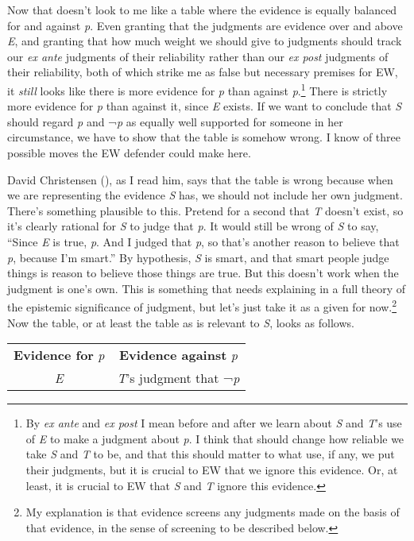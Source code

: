 \documentclass[
  11pt,
  letterpaper,
  DIV=11,
  numbers=noendperiod,
  twoside]{scrartcl}
\begin{document}
Now that doesn't look to me like a table where the evidence is equally
balanced for and against \emph{p}. Even granting that the judgments are
evidence over and above \emph{E}, and granting that how much weight we
should give to judgments should track our \emph{ex ante} judgments of
their reliability rather than our \emph{ex post} judgments of their
reliability, both of which strike me as false but necessary premises for
EW, it \emph{still} looks like there is more evidence for \emph{p} than
against \emph{p}.\footnote{By \emph{ex ante} and \emph{ex post} I mean
  before and after we learn about \emph{S} and \emph{T}'s use of
  \emph{E} to make a judgment about \emph{p}. I think that should change
  how reliable we take \emph{S} and \emph{T} to be, and that this should
  matter to what use, if any, we put their judgments, but it is crucial
  to EW that we ignore this evidence. Or, at least, it is crucial to EW
  that \emph{S} and \emph{T} ignore this evidence.} There is strictly
more evidence for \emph{p} than against it, since \emph{E} exists. If we
want to conclude that \emph{S} should regard \emph{p} and ¬\emph{p} as
equally well supported for someone in her circumstance, we have to show
that the table is somehow wrong. I know of three possible moves the EW
defender could make here.

David Christensen (), as I
read him, says that the table is wrong because when we are representing
the evidence \emph{S} has, we should not include her own judgment.
There's something plausible to this. Pretend for a second that \emph{T}
doesn't exist, so it's clearly rational for \emph{S} to judge that
\emph{p}. It would still be wrong of \emph{S} to say, ``Since \emph{E}
is true, \emph{p}. And I judged that \emph{p}, so that's another reason
to believe that \emph{p}, because I'm smart.'' By hypothesis, \emph{S}
is smart, and that smart people judge things is reason to believe those
things are true. But this doesn't work when the judgment is one's own.
This is something that needs explaining in a full theory of the
epistemic significance of judgment, but let's just take it as a given
for now.\footnote{My explanation is that evidence screens any judgments
  made on the basis of that evidence, in the sense of screening to be
  described below.} Now the table, or at least the table as is relevant
to \emph{S}, looks as follows.

\begin{longtable}[]{@{}cc@{}}
\toprule\noalign{}
\endhead
\bottomrule\noalign{}
\endlastfoot
\textbf{Evidence for} \emph{p} & \textbf{Evidence against} \emph{p} \\
\emph{E} & \emph{T}'s judgment that ¬\emph{p} \\
\end{longtable}
\end{document}
